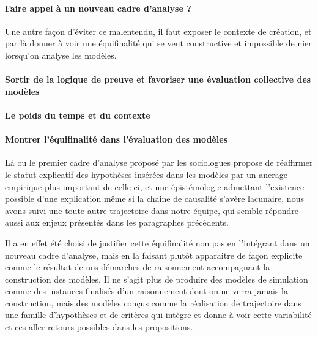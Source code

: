 \paragraph{Faire appel à un nouveau cadre d'analyse ?}
\label{p:cadre_analyse}


Une autre façon d'éviter ce malentendu, il faut exposer le contexte de création, et par là donner à voir une équifinalité qui se veut constructive et impossible de nier lorsqu'on analyse les modèles.

\paragraph{Sortir de la logique de preuve et favoriser une évaluation collective des modèles}
\label{p:preuve}



\paragraph{Le poids du temps et du contexte }
\label{p:poids}



\paragraph{Montrer l'équifinalité dans l'évaluation des modèles}
\label{p:nvlle_equifinalite}

Là ou le premier cadre d'analyse proposé par les sociologues propose de réaffirmer le statut explicatif des hypothèses insérées dans les modèles par un ancrage empirique plus important de celle-ci, et une épistémologie admettant l'existence possible d'une explication même si la chaine de causalité s'avère lacunaire, nous avons suivi une toute autre trajectoire dans notre équipe, qui semble répondre aussi aux enjeux présentés dans les paragraphes précédents.

Il a en effet été choisi de justifier cette équifinalité non pas en l'intégrant dans un nouveau cadre d'analyse, mais en la faisant plutôt apparaitre de façon explicite comme le résultat de nos démarches de raisonnement accompagnant la construction des modèles. Il ne s'agit plus de produire des modèles de simulation comme des instances finalisés d'un raisonnement dont on ne verra jamais la construction, mais des modèles conçus comme la réalisation de trajectoire dans une famille d'hypothèses et de critères qui intègre et donne à voir cette variabilité et ces aller-retours possibles dans les propositions.

